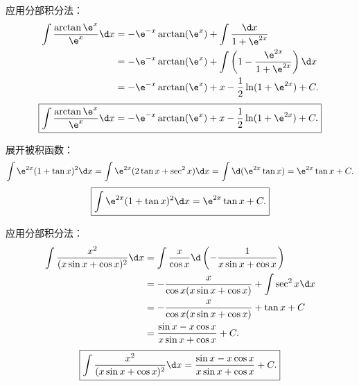 \begin{solution}

    应用分部积分法：
    \begin{equation}
        \begin{aligned}
            \int \frac{\arctan \e^x}{\e^x} \d x & = -\e^{-x}\arctan(\e^x) + \int \frac{\d x}{1 + \e^{2x}}                            \\
                                                & = -\e^{-x}\arctan(\e^x) + \int \left( 1 - \frac{\e^{2x}}{1 + \e^{2x}} \right) \d x \\
                                                & = -\e^{-x}\arctan(\e^x) + x - \frac{1}{2}\ln(1 + \e^{2x}) + C.
        \end{aligned}
    \end{equation}
    \begin{equation}
        \boxed{\int \frac{\arctan \e^x}{\e^x} \d x = -\e^{-x}\arctan(\e^x) + x - \frac{1}{2}\ln(1 + \e^{2x}) + C.}
    \end{equation}


    展开被积函数：
    \begin{equation}
        \int \e^{2x}(1 + \tan x)^2 \d x = \int \e^{2x}(2\tan x + \sec^2 x) \d x = \int \d(\e^{2x}\tan x) = \e^{2x}\tan x + C.
    \end{equation}
    \begin{equation}
        \boxed{\int \e^{2x}(1 + \tan x)^2 \d x = \e^{2x}\tan x + C.}
    \end{equation}


    应用分部积分法：
    \begin{equation}
        \begin{aligned}
            \int \frac{x^2}{(x\sin x + \cos x)^2} \d x & = \int \frac{x}{\cos x} \d\left( -\frac{1}{x\sin x + \cos x} \right) \\
                                                       & = -\frac{x}{\cos x(x\sin x + \cos x)} + \int \sec^2 x \d x           \\
                                                       & = -\frac{x}{\cos x(x\sin x + \cos x)} + \tan x + C                   \\
                                                       & = \frac{\sin x - x\cos x}{x\sin x + \cos x} + C.
        \end{aligned}
    \end{equation}
    \begin{equation}
        \boxed{\int \frac{x^2}{(x\sin x + \cos x)^2} \d x = \frac{\sin x - x\cos x}{x\sin x + \cos x} + C.}
    \end{equation}


\end{solution}
